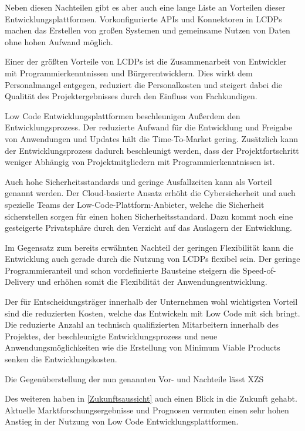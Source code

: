 \documentclass[12pt]{article} %
\begin{document}
	Neben diesen Nachteilen gibt es aber auch eine lange Liste an Vorteilen dieser Entwicklungsplattformen. Vorkonfigurierte APIs und Konnektoren in LCDPs machen das Erstellen von großen Systemen und gemeinsame Nutzen von Daten ohne hohen Aufwand möglich. 
	
	Einer der größten Vorteile von LCDPs ist die Zusammenarbeit von Entwickler mit Programmierkenntnissen und Bürgerentwicklern. Dies wirkt dem Personalmangel entgegen, reduziert die Personalkosten und steigert dabei die Qualität des Projektergebnisses durch den Einfluss von Fachkundigen. 
	
	Low Code Entwicklungsplattformen beschleunigen Außerdem den Entwicklungsprozess. Der reduzierte Aufwand für die Entwicklung und Freigabe von Anwendungen und Updates hält die Time-To-Market gering. Zusätzlich kann der Entwicklungsprozess dadurch beschleunigt werden, dass der Projektfortschritt weniger Abhängig von Projektmitgliedern mit Programmierkenntnissen ist. 
	
	Auch hohe Sicherheitsstandards und geringe Ausfallzeiten kann als Vorteil genannt werden. Der Cloud-basierte Ansatz erhöht die Cybersicherheit und auch spezielle Teams der Low-Code-Plattform-Anbieter, welche die Sicherheit sicherstellen sorgen für einen hohen Sicherheitsstandard. Dazu kommt noch eine gesteigerte Privatsphäre durch den Verzicht auf das Auslagern der Entwicklung. 
	
	Im Gegensatz zum bereits erwähnten Nachteil der geringen Flexibilität kann die Entwicklung auch gerade durch die Nutzung von LCDPs flexibel sein. Der geringe Programmieranteil und schon vordefinierte Bausteine steigern die Speed-of-Delivery und erhöhen somit die Flexibilität der Anwendungsentwicklung. 
	
	Der für Entscheidungsträger innerhalb der Unternehmen wohl wichtigsten Vorteil sind die reduzierten Kosten, welche das Entwickeln mit Low Code mit sich bringt. Die reduzierte Anzahl an technisch qualifizierten Mitarbeitern innerhalb des Projektes, der beschleunigte Entwicklungsprozess und neue Anwendungsmöglichkeiten wie die Erstellung von Minimum Viable Products senken die Entwicklungskosten. \newline
	
	Die Gegenüberstellung der nun genannten Vor- und Nachteile lässt XZS \newline
	
	
	Des weiteren haben in \ref{Zukunftsaussicht} auch einen Blick in die Zukunft gehabt. Aktuelle Marktforschungsergebnisse und Prognosen vermuten einen sehr hohen Anstieg in der Nutzung von Low Code Entwicklungsplattformen. 
	
	
	\newpage	
	\printbibliography 
\end{document}
